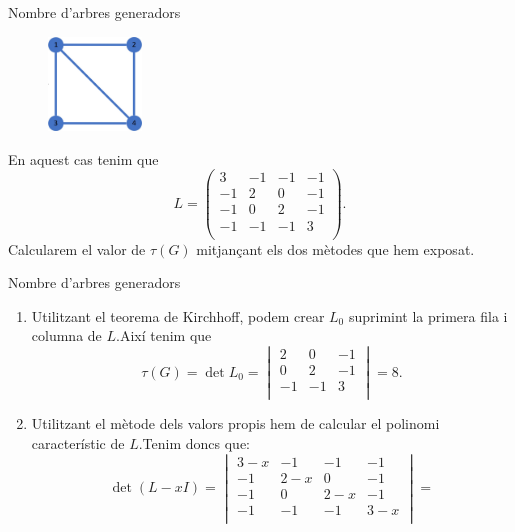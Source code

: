 \documentclass{beamer}
\begin{document}
\begin{frame}{Nombre d'arbres generadors}
\begin{exampleblock}{}
    \begin{figure}
          \centering
          \includegraphics[width=2.5cm]{imatges/graf1.jpg}
      \end{figure}
    En aquest cas tenim que $$L=\begin{pmatrix}
       3 & -1 & -1 & -1\\
       -1 & 2 & 0 & -1\\
       -1 & 0 & 2 & -1\\
       -1 & -1 & -1 & 3\\
       \end{pmatrix}.$$\pause
       Calcularem el valor de $\tau(G)$ mitjançant els dos mètodes que hem exposat.
\end{exampleblock}
\end{frame}
\begin{frame}{Nombre d'arbres generadors}
\begin{exampleblock}{}
\begin{enumerate}
           \item Utilitzant el teorema de Kirchhoff, podem crear $L_0$ suprimint la primera fila i columna de $L$.\pause\space Així tenim que $$\tau(G)=\det L_0=\begin{vmatrix}
            2 & 0 & -1\\
            0 & 2 & -1\\
            -1 & -1 & 3\\
            \end{vmatrix}=8.$$\pause
            \item Utilitzant el mètode dels valors propis hem de calcular el polinomi característic de $L$.\pause\space Tenim doncs que:
            $$\det(L-xI)=\begin{vmatrix}
        3-x & -1 & -1 & -1\\
       -1 & 2-x & 0 & -1\\
       -1 & 0 & 2-x & -1\\
       -1 & -1 & -1 & 3-x\\
    \end{vmatrix}=$$
       \end{enumerate} 
\end{exampleblock}
\end{frame}
\end{document}
